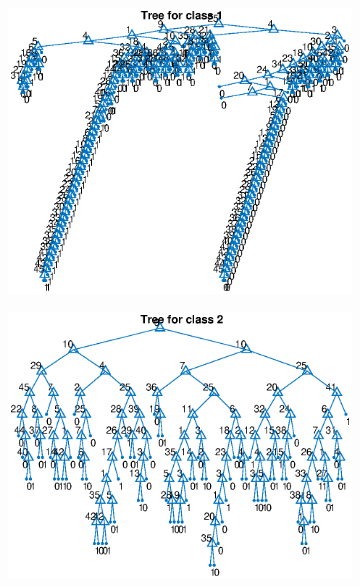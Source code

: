 \documentclass{article}
\begin{document}
\begin{figure}
 \centering
 \begin{subfigure}[b]{.49\textwidth}
   \includegraphics[width=\textwidth]{noisytree1.eps}
 \end{subfigure}
 \begin{subfigure}[b]{.49\textwidth}
   \includegraphics[width=\textwidth]{noisytree2.eps}
 \end{subfigure}
 \begin{subfigure}[b]{.49\textwidth}

\end{subfigure}
\end{figure}
\end{document}
